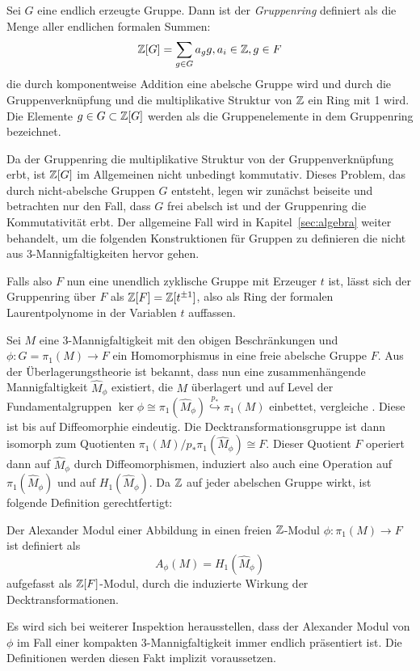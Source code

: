     	\begin{defn}[Gruppenring]
    		Sei $G$ eine endlich erzeugte Gruppe. Dann ist der \textit{Gruppenring} definiert als die Menge aller endlichen formalen Summen:
    		\[
    			\mathbb{Z}[G] = \sum_{g \in G} a_g g, a_i \in \mathbb{Z}, g \in F
    		\]
            die durch komponentweise Addition eine abelsche Gruppe wird und durch die Gruppenverknüpfung und die multiplikative Struktur von $\mathbb{Z}$ ein Ring mit 1 wird. Die Elemente $g \in G \subset \mathbb{Z}[G]$ werden als die Gruppenelemente in dem Gruppenring bezeichnet.
    	\end{defn}
        \begin{bem}
            Da der Gruppenring die multiplikative Struktur von der Gruppenverknüpfung erbt, ist $\mathbb{Z} [G]$ im Allgemeinen nicht unbedingt kommutativ. Dieses Problem, das durch nicht-abelsche Gruppen $G$ entsteht, legen wir zunächst beiseite und betrachten nur den Fall, dass $G$ frei abelsch ist und der Gruppenring die Kommutativität erbt. Der allgemeine Fall wird in Kapitel~\ref{sec:algebra} weiter behandelt, um die folgenden Konstruktionen für Gruppen zu definieren die nicht aus 3-Mannigfaltigkeiten hervor gehen.
        \end{bem}
        \label{wirkung:gruppenring}
\begin{bsp}
        Falls also $F$ nun eine unendlich zyklische Gruppe mit Erzeuger $t$ ist, lässt sich der Gruppenring über $F$ als $\mathbb{Z}[F] = \mathbb{Z}[t^{\pm 1}]$, also als Ring der formalen Laurentpolynome in der Variablen $t$ auffassen. 
\end{bsp}

    	Sei $M$ eine 3-Mannigfaltigkeit mit den obigen Beschränkungen und $\phi: G=\pi_1(M) \to F$ ein Homomorphismus in eine freie abelsche Gruppe $F$. Aus der Überlagerungstheorie ist bekannt, dass nun eine zusammenhängende Mannigfaltigkeit $\hat M_\phi$ existiert, die $M$ überlagert und auf Level der Fundamentalgruppen $\ker \phi \cong \pi_1 (\hat M_\phi) \stackrel{p_*}{\hookrightarrow} \pi_1(M)$ einbettet, vergleiche \cite[Kapitel~1.3]{Hatcher.2002}. Diese ist bis auf Diffeomorphie eindeutig. Die Decktransformationsgruppe ist dann isomorph zum Quotienten $\pi_1(M)/p_*\pi_1(\hat M_\phi) \cong F$. Dieser Quotient $F$ operiert dann auf $\hat M_\phi$ durch Diffeomorphismen, induziert also auch eine Operation auf $\pi_1(\hat M_\phi)$ und auf $H_1(\hat M_\phi)$. Da $\mathbb{Z}$ auf jeder abelschen Gruppe wirkt, ist folgende Definition gerechtfertigt:
    	\begin{defn}
    		Der Alexander Modul einer Abbildung in einen freien $\mathbb{Z}$-Modul $\phi: \pi_1(M) \to F$ ist definiert als
    		\[
    			A_\phi(M) = H_1(\hat M_\phi)
    		\]
    		aufgefasst als $\mathbb{Z}[F]$-Modul, durch die induzierte Wirkung der Decktransformationen.
    	\end{defn}
    	Es wird sich bei weiterer Inspektion herausstellen, dass der Alexander Modul von $\phi$ im Fall einer kompakten 3-Mannigfaltigkeit immer endlich präsentiert ist. Die Definitionen werden diesen Fakt implizit voraussetzen.

